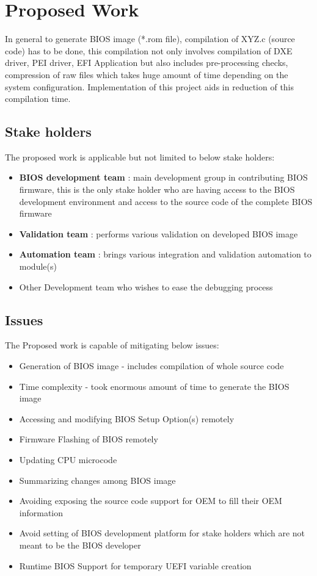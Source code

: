 \section{Proposed Work}\label{section-proposed-work}
In general to generate BIOS image (*.rom file), compilation of XYZ.c (source code) has to be done, this compilation not only involves compilation of DXE driver, PEI driver, EFI Application but also includes pre-processing checks, compression of raw files which takes huge amount of time depending on the system configuration. Implementation of this project aids in reduction of this compilation time.

\subsection{Stake holders}\label{subsection-stack-holders}
The proposed work is applicable but not limited to below stake holders:
\begin{itemize}
	\item \textbf{BIOS development team} : main development group in contributing BIOS firmware, this is the only stake holder who are having access to the BIOS development environment and access to the source code of the complete BIOS firmware
	\item \textbf{Validation team} : performs various validation on developed BIOS image
	\item \textbf{Automation team} : brings various integration and validation automation to module(s)
	\item Other Development team who wishes to ease the debugging process
\end{itemize}

\subsection{Issues}\label{subsection-issues}
The Proposed work is capable of mitigating below issues:
\begin{itemize}
	\item Generation of BIOS image - includes compilation of whole source code
	\item Time complexity - took enormous amount of time to generate the BIOS image
	\item Accessing and modifying BIOS Setup Option(s) remotely
	\item Firmware Flashing of BIOS remotely
	\item Updating CPU microcode
	\item Summarizing changes among BIOS image
	\item Avoiding exposing the source code support for OEM to fill their OEM information
	\item Avoid setting of BIOS development platform for stake holders which are not meant to be the BIOS developer
	\item Runtime BIOS Support for temporary UEFI variable creation
\end{itemize}

